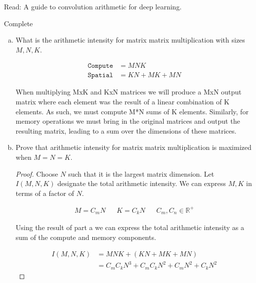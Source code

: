 \documentclass[11pt]{article}
\begin{document}
Read: A guide to convolution arithmetic for deep learning.
\begin{solution}
	Complete
\end{solution}

\begin{enumerate}[(a)]\itemsep0pt
  \item
    What is the arithmetic intensity for matrix matrix multiplication with
		sizes $M, N, K$.

\begin{solution}
	\begin{align}
		\texttt{Compute} &= M N K \\
		\texttt{Spatial} &= KN + MK + MN
	\end{align}

	When multiplying MxK and KxN matrices we will produce a MxN output matrix
	where each element was the result of a linear combination of K elements.
	As such, we must compute M*N sums of K elements.
	Similarly, for memory operations we must bring in the original matrices and output
	the resulting matrix, leading to a sum over the dimensions of these matrices.
\end{solution}

  \item
	  Prove that arithmetic intensity for matrix matrix multiplication is
		maximized when $M=N=K$.
	\begin{proof}
		Choose $N$ such that it is the largest matrix dimension. Let $I(M, N,
		K)$ designate the total arithmetic intensity.
		We can express $M, K$ in terms of a factor of $N$.

		\begin{align}
			M = C_m N && K = C_k N && C_m, C_n \in \mathbb R^+
		\end{align}

		Using the result of part a we can express the total arithmetic
		intensity as a sum of the compute and memory components.

		\begin{align}
			I(M, N, K) &= M N K + \left(K N + M K + M N \right)\\
			& = C_m C_k N^3 + C_m C_k N^2 + C_m N^2 + C_k N^2
		\end{align}


\end{proof}
\end{enumerate}
\end{document}
